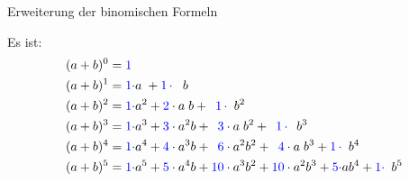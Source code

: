 \documentclass[12pt,ngerman,a4paper,ignorenonframetext,]{beamer}
\begin{document}
\begin{frame}{Erweiterung der binomischen Formeln}
\protect\hypertarget{erweiterung-der-binomischen-formeln}{}

\newcommand{\mycolor}{\color{blue}}

Es ist: \begin{align*}
        (a+b)^0 &= {\color{blue}1}\\
        (a+b)^1 &= {\color{blue}1 \cdot} a \; + {\color{blue}1 \, \cdot} \phantom{a}\;b\\
        (a+b)^2 &= {\color{blue}1 \cdot} a^2 + {\color{blue}2} \cdot a\;b + \phantom{0} {\color{blue}1 \, \cdot} \phantom{a}b^2\\ 
        (a+b)^3 &= {\color{blue}1 \cdot} a^3 + {\color{blue}3} \cdot a^2b + \phantom{0} {\color{blue}3}   \cdot a\;b^2 + \phantom{0}{\color{blue}1 \, \cdot} \,\phantom{a}b^3 \\ 
        (a+b)^4 &= {\color{blue}1 \cdot} a^4 + {\color{blue}4} \cdot a^3b + \phantom{0} {\color{blue}6}   \cdot a^2b^2 + \phantom{0}{\color{blue}4}   \cdot a\;b^3 + {\color{blue}1 \, \cdot}\phantom{a}b^4 \\
        (a+b)^5 &= {\color{blue}1 \cdot} a^5 + {\color{blue}5} \cdot a^4b +            {\color{blue}10}   \cdot a^3b^2 +            {\color{blue}10}   \cdot a^2b^3 + {\color{blue}5 \cdot}ab^4 + {\color{blue}1 \cdot}\phantom{a}b^5
\end{align*}

\end{frame}
\end{document}
